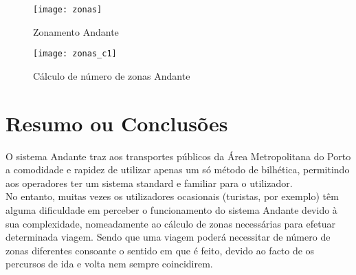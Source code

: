\begin{figure}[t]
  \begin{center}
    \leavevmode
    \texttt{[image: zonas]}
    \caption{Zonamento Andante}
    \label{fig:zonas}
  \end{center}
\end{figure}

\begin{figure}[t]
  \begin{center}
    \leavevmode
    \texttt{[image: zonas\_c1]}
    \caption{Cálculo de número de zonas Andante \cite{calczonas}}
    \label{fig:zonas_c1}
  \end{center}
\end{figure}

\section{Resumo ou Conclusões}

O sistema Andante traz aos transportes públicos da Área Metropolitana do Porto a comodidade e rapidez de utilizar apenas um só método de bilhética, permitindo aos operadores ter um sistema standard e familiar para o utilizador.
\\No entanto, muitas vezes os utilizadores ocasionais (turistas, por exemplo) têm alguma dificuldade em perceber o funcionamento do sistema Andante devido à sua complexidade, nomeadamente ao cálculo de zonas necessárias para efetuar determinada viagem. Sendo que uma viagem poderá necessitar de número de zonas diferentes consoante o sentido em que é feito, devido ao facto de os percursos de ida e volta nem sempre coincidirem.